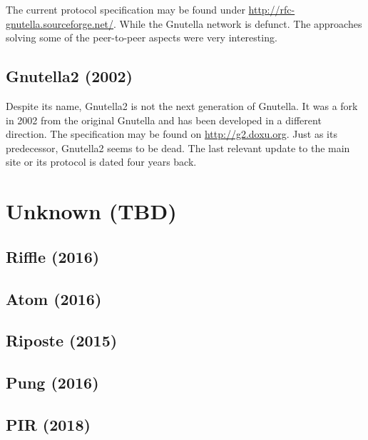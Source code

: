 The current protocol specification may be found under \href{http://rfc-gnutella.sourceforge.net/developer/stable/index.html}{http://rfc-gnutella.sourceforge.net/}. While the Gnutella network is defunct. The approaches solving some of the peer-to-peer aspects were very interesting.

\subsection{Gnutella2 (2002)}
Despite its name, Gnutella2 is not the next generation of Gnutella. It was a fork in 2002 from the original Gnutella and has been developed in a different direction. The specification may be found on \url{http://g2.doxu.org}. Just as its predecessor, Gnutella2 seems to be dead. The last relevant update to the main site or its protocol is dated four years back.

\section{Unknown (TBD)}
\subsection{Riffle (2016)}
\cite{kwon2016riffle}

%

\subsection{Atom (2016)}
\cite{kwon2016atom}

%

\subsection{Riposte (2015)}
\cite{corrigan2015riposte}

%

\subsection{Pung (2016)}
\cite{angel2016unobservable}

%

\subsection{PIR (2018)}
\cite{angel2018pir}

